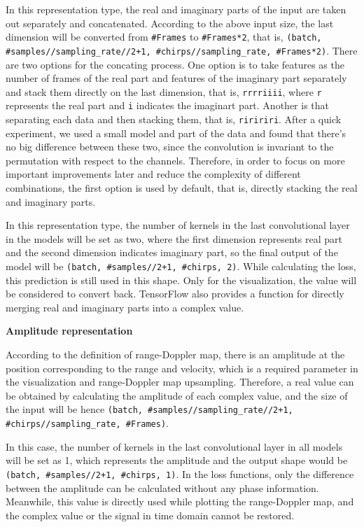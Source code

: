 In this representation type, the real and imaginary parts of the input are taken out separately and concatenated. According to the above input size, the last dimension will be converted from \texttt{\#Frames} to \texttt{\#Frames*2}, that is, \texttt{(batch, \#samples//sampling\_rate//2+1, \#chirps//sampling\_rate, \#Frames*2)}. There are two options for the concating process. One option is to take features as the number of frames of the real part and features of the imaginary part separately and stack them directly on the last dimension, that is, \texttt{rrrriiii}, where \texttt{r} represents the real part and \texttt{i} indicates the imaginart part. Another is that separating each data and then stacking them, that is, \texttt{riririri}. After a quick experiment, we used a small model and part of the data and found that there's no big difference between these two, since the convolution is invariant to the permutation with respect to the channels. Therefore, in order to focus on more important improvements later and reduce the complexity of different combinations, the first option is used by default, that is, directly stacking the real and imaginary parts.

In this representation type, the number of kernels in the last convolutional layer in the models will be set as two, where the first dimension represents real part and the second dimension indicates imaginary part, so the final output of the model will be \texttt{(batch, \#samples//2+1, \#chirps, 2)}. While calculating the loss, this prediction is still used in this shape. Only for the visualization, the value will be considered to convert back. TensorFlow also provides a function for directly merging real and imaginary parts into a complex value.

\begin{spacing}{1.5}
\textbf{\large{Amplitude representation}}
\end{spacing}

According to the definition of range-Doppler map, there is an amplitude at the position corresponding to the range and velocity, which is a required parameter in the visualization and range-Doppler map upsampling. Therefore, a real value can be obtained by calculating the amplitude of each complex value, and the size of the input will be hence \texttt{(batch, \#samples//sampling\_rate//2+1, \#chirps//sampling\_rate, \#Frames)}.

In this case, the number of kernels in the last convolutional layer in all models will be set as 1, which represents the amplitude and the output shape would be \texttt{(batch, \#samples//2+1, \#chirps, 1)}. In the loss functions, only the difference between the amplitude can be calculated without any phase information. Meanwhile, this value is directly used while plotting the range-Doppler map, and the complex value or the signal in time domain cannot be restored.


